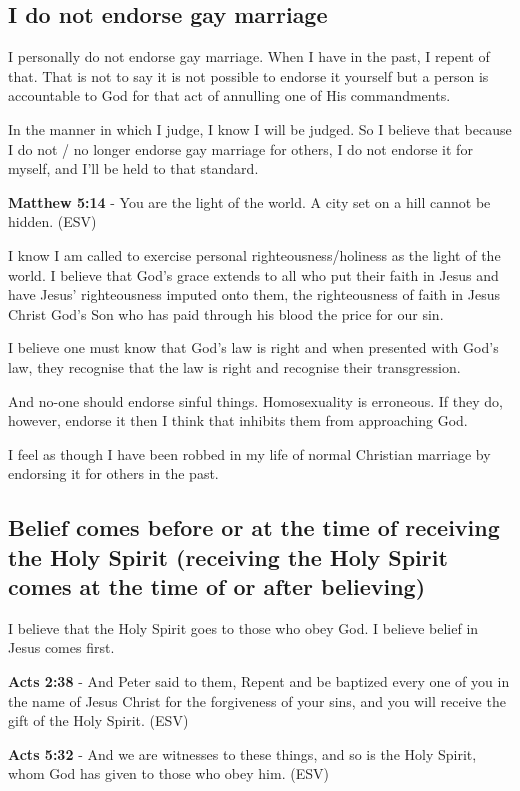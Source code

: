 \documentclass[11pt]{article}
\begin{document}
\subsection{I do not endorse gay marriage}
\label{sec:orgdeb58e3}
I personally do not endorse gay marriage. When I have in the past, I repent of that. That is not to say it is not possible to endorse it yourself but a person is accountable to God for that act of annulling one of His commandments.

In the manner in which I judge, I know I will be judged. So I believe that because I do not / no longer endorse gay marriage for others, I do not endorse it for myself, and I'll be held to that standard.

\textbf{Matthew 5:14} - You are the light of the world.  A city set on a hill cannot be hidden.  (ESV)

I know I am called to exercise personal righteousness/holiness as the light of the world. I believe that God's grace extends to all who put their faith in Jesus and have Jesus' righteousness imputed onto them, the righteousness of faith in Jesus Christ God's Son who has paid through his blood the price for our sin.

I believe one must know that God's law is right and when presented with God's law, they recognise that the law is right and recognise their transgression.

And no-one should endorse sinful things. Homosexuality is erroneous.
If they do, however, endorse it then I think that inhibits them from approaching God.

I feel as though I have been robbed in my life of normal Christian marriage by endorsing it for others in the past.

\subsection{Belief comes before or at the time of receiving the Holy Spirit (receiving the Holy Spirit comes at the time of or after believing)}
\label{sec:org6083b1a}
I believe that the Holy Spirit goes to those who obey God. I believe belief in Jesus comes first.

\textbf{Acts 2:38} - And Peter said to them, Repent and be baptized every one of you in the name of Jesus Christ for the forgiveness of your sins, and you will receive the gift of the Holy Spirit. (ESV)

\textbf{Acts 5:32} - And we are witnesses to these things, and so is the Holy Spirit, whom God has given to those who obey him. (ESV)
\end{document}
